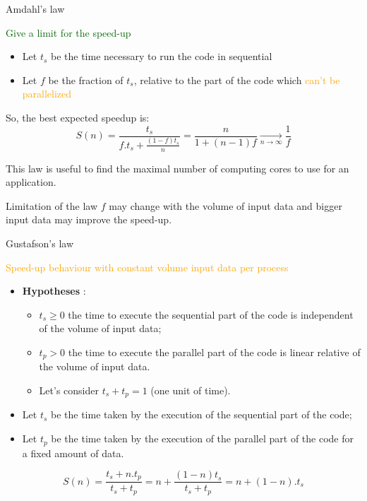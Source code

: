 \documentclass[compress,10pt,aspectratio=169]{beamer}
\begin{document}
\begin{frame}[fragile]{Amdahl's law}
\scriptsize
\begin{center}\textcolor{DarkGreen}{\large Give a limit for the speed-up}\end{center}

\begin{itemize}
\item Let $t_{s}$ be the time necessary to run the code in sequential
\item Let $f$ be the fraction of $t_{s}$, relative to the part of the code which \textcolor{orange}{can't be parallelized}
\end{itemize}

So, the best expected speedup is:
\[
    S(n) = \frac{t_{s}}{f.t_{s}+\frac{(1-f)t_{s}}{n}} = \frac{n}{1+(n-1)f} \xrightarrow[n \to \infty]{} \frac{1}{f}
\]

This law is useful to find the maximal number of computing cores to use for an application.

\begin{alertblock}{Limitation of the law}
    $f$ may change with the volume of input data and bigger input data may improve the speed-up.
\end{alertblock}
\end{frame}

\begin{frame}[fragile]{Gustafson's law}
\scriptsize
\begin{center}{\large \textcolor{orange}{Speed-up behaviour with constant volume input data per process}}\end{center}

\begin{itemize}
\item \textbf{Hypotheses} : 
\begin{itemize}
    \item {\scriptsize $t_{s}\geq 0$ the time to execute the sequential part of the code is independent of the volume of input data;}
    \item {\scriptsize $t_{p} > 0$ the time to execute the parallel part of the code is linear relative of the volume of input data.}
    \item {\scriptsize Let's consider $t_{s}+t_{p} = 1$ (one unit of time)}.
\end{itemize}
\item Let $t_{s}$ be the time taken by the execution of the sequential part of the code;
\item Let $t_{p}$ be the time taken by the execution of the parallel part of the code for a fixed amount of data.
\end{itemize}

\[
    S(n) = \frac{t_{s}+n.t_{p}}{t_{s}+t_{p}} = n + \frac{(1-n)t_{s}}{t_{s}+t_{p}}
                                             = n + (1-n).t_{s}
\]
\end{frame}
\end{document}
